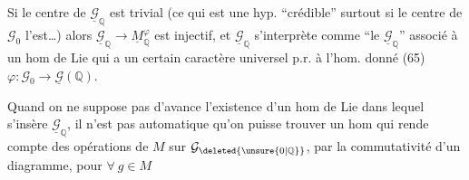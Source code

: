 Si le centre de $\underline{\mathcal{G}}_{\mathbb Q}$ est trivial (ce qui est une hyp. ``crédible'' surtout si le centre de $\mathcal{G}_0$ l'est\ldots) alors $\underline{\mathcal{G}}_{\mathbb Q}\longrightarrow\underline{M}_{\mathbb Q}^{\varphi}$ est injectif, et $\underline{\mathcal{G}}_{\mathbb Q}$ s'interprète comme ``le $\underline{\mathcal{G}}_{\mathbb Q}$'' associé à un hom de Lie
qui a un certain caractère universel p.r. à l'hom. donné (65) $\varphi:\mathcal{G}_0\longrightarrow\underline{\mathcal{G}}(\mathbb Q)$.

Quand on ne suppose pas d'avance l'existence d'un  hom de Lie dans lequel s'insère $\underline{\mathcal{G}}_{\mathbb Q}$, il n'est pas automatique qu'on puisse trouver un hom
qui rende compte des opérations de $M$ sur $\mathcal{G}_{\deleted{\unsure{0|\mathbb Q}}}$, par la commutativité d'un diagramme, pour $\forall\ g\in M$

